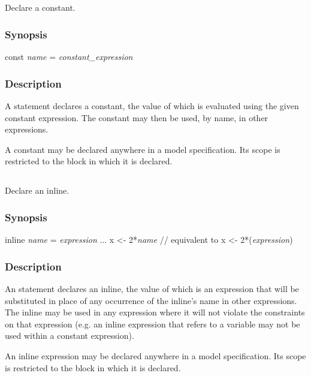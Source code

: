 \subsection{\label{const}}

Declare a constant.

\subsubsection*{Synopsis\label{const_Synopsis}}
\begin{bicode}
const \textsl{name} = \textsl{constant_expression}
\end{bicode}

\subsubsection*{Description\label{const_description}}

A  statement declares a constant, the
value of which is evaluated using the given constant
expression. The constant may then be used, by
name, in other expressions.

A constant may be declared anywhere in a model
specification. Its scope is restricted to the block in which it is
declared.

\subsection{\label{inline}}

Declare an inline.

\subsubsection*{Synopsis\label{inline_synopsis}}
\begin{bicode}
inline \textsl{name} = \textsl{expression}
...
x <- 2*\textsl{name}  // equivalent to x <- 2*(\textsl{expression})
\end{bicode}

\subsubsection*{Description\label{inline_description}}

An  statement declares an
inline, the value of which is an expression that
will be substituted in place of any occurrence of the inline's name in other
expressions. The inline may be used in any expression where it will not
violate the constraints on that expression (e.g. an inline expression that
refers to a  variable may not be used within a constant
expression).

An inline expression may be declared anywhere in a
model specification. Its scope is restricted to the block in which it is
declared.
